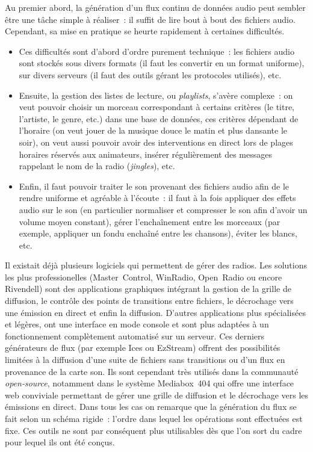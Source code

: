 \documentclass[twoside]{article}
\theoremstyle{plain}
\theoremstyle{definition}
\theoremstyle{remark}
\begin{document}
Au premier abord, la génération d'un flux continu de données audio peut sembler
être une tâche simple à réaliser~: il suffit de lire bout à bout des fichiers
audio. Cependant, sa mise en pratique se heurte rapidement à certaines
difficultés.
\begin{itemize}
\item Ces difficultés sont d'abord d'ordre purement technique~: les fichiers
  audio sont stockés sous divers formats (il faut les convertir en un format
  uniforme), sur divers serveurs (il faut des outils gérant les protocoles
  utilisés), etc.
\item Ensuite, la gestion des listes de lecture, ou \emph{playlists}, s'avère
  complexe~: on veut pouvoir choisir un morceau correspondant à certains
  critères (le titre, l'artiste, le genre, etc.) dans une base de données, ces
  critères dépendant de l'horaire (on veut jouer de la musique douce le matin et
  plus dansante le soir), on veut aussi pouvoir avoir des interventions en
  direct lors de plages horaires réservés aux animateurs,
  insérer régulièrement des messages rappelant le nom de la radio
  (\emph{jingles}), etc.
\item Enfin, il faut pouvoir traiter le son provenant des fichiers audio afin de
  le rendre uniforme et agréable à l'écoute~: il faut à la fois appliquer des
  effets audio sur le son (en particulier normaliser et compresser le son afin
  d'avoir un volume moyen constant), gérer l'enchaînement entre les morceaux
  (par exemple, appliquer un fondu enchaîné entre les chansons), éviter les
  blancs, etc.
\end{itemize}

Il existait déjà plusieurs logiciels qui permettent de gérer des radios.
%
Les solutions les plus professionelles
(Master~Control, WinRadio, Open~Radio ou encore Rivendell)
sont des applications graphiques intégrant la gestion de la grille de 
diffusion, le contrôle des points de transitions entre fichiers,
le décrochage vers une émission en direct et enfin la diffusion.
%
D'autres applications plus spécialisées et légères, 
ont une interface en mode console et sont plus adaptées à un fonctionnement 
complètement automatisé sur un serveur.
Ces derniers générateurs de flux (par exemple Ices ou EzStream)
offrent des possibilités limitées à la diffusion d'une suite de fichiers sans 
transitions ou d'un flux en provenance de la carte son.
Ils sont cependant très utilisés dans la communauté
\emph{open-source}, notamment dans le système Mediabox~404 qui offre une 
interface web conviviale permettant de gérer une grille de diffusion et le 
décrochage vers les émissions en direct.
%
Dans tous les cas on remarque que la génération du flux se fait selon un schéma
rigide~: l'ordre dans lequel les opérations sont effectuées est fixe. Ces outils
ne sont par conséquent plus utilisables dès que l'on sort du cadre pour lequel
ils ont été conçus.
\end{document}
